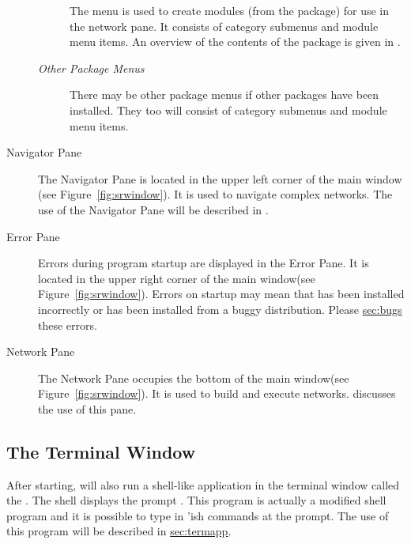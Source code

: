 \begin{description}
  \begin{description}
  \item[] The  menu is used to create modules
    (from the \pse package) for use in the network pane.  It consists
    of category submenus and module menu items.   An overview of the
    contents of the \sr{} package is given in .
  \end{description}

  \begin{description}
  \item [\textit{Other Package Menus}] There may be other package
    menus if other packages have been installed.  They too will consist
    of category submenus and module menu items.
  \end{description}
  
\item[Navigator Pane] The Navigator Pane is located in the upper left
  corner of the main window (see Figure~\ref{fig:srwindow}). It is used to
  navigate complex networks.  The use of the Navigator Pane will be
  described in .
  
\item[Error Pane] Errors during program startup are displayed in the Error
  Pane.  It is located in the upper right corner of the main window(see
  Figure~\ref{fig:srwindow}).  Errors on startup may mean that \sr{} has
  been installed incorrectly or has been installed from a buggy
  distribution.  Please \hyperref{report}{(see Section~}{)}{sec:bugs} these
  errors.
  
\item[Network Pane] The Network Pane occupies the bottom of the main
  window(see Figure~\ref{fig:srwindow}).  It is used to build and execute
  networks.   discusses the use
  of this pane.

\end{description}

\subsection{The Terminal Window}
\label{sec:termwinapp}

After starting, \sr{} will also run a shell-like application in the
terminal window called the .  The \sr{} shell displays the
prompt .  This program is actually a modified  shell program and it is possible to type in
'ish \sr{} commands at the prompt. The use of this program
will be described in \hyperref{a later section}{Section~}{}{sec:termapp}.


